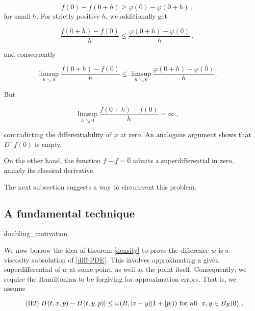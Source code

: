 		\begin{equation*}
			f(0) - f(0 + h) \geq \varphi(0) - \varphi(0 + h)  \ ,
		\end{equation*}
		for small $ h $. For strictly positive $ h $, we additionally get
		
		\begin{equation*}
			\frac{f( 0 + h) - f(0)}{h} \leq \frac{\varphi(0 + h) - \varphi(0)}{h} \ ,
		\end{equation*}
		
		and consequently 
		
		\begin{equation*}
			\limsup\limits_{h \searrow 0} \frac{f( 0 + h) - f(0)}{h} \leq \limsup\limits_{h \searrow 0} \frac{\varphi(0 + h) - \varphi(0)}{h} \ .
		\end{equation*}
		
		But 
		
		\begin{equation*}
			\limsup\limits_{h \searrow 0} \frac{f( 0 + h) - f(0)}{h} = \infty \ ,
		\end{equation*}
		
		contradicting the differentiability of $ \varphi $ at zero. An analogous argument shows that $ D^{-}f(0) $ is empty.
		
		On the other hand, the function $ f - f = \hat{0} $ admits a superdifferential in zero, namely its classical derivative.
		
		The next subsection suggests a way to circumvent this problem.
		
	\subsection{A fundamental technique}
	
		 {doubling_motivation}
		 
		 We now borrow the idea of theorem \ref{density} to prove the difference $ w $ is a viscosity subsolution of \eqref{diff-PDE}. This involves approximating a given superdifferential of $ w $ at some point, as well as the point itself. Consequently; we require the Hamiltonian to be forgiving for approximation errors. That is, we assume
		 
		 \begin{equation}
		 \tag{H2}
		 \lvert H(t, x, p) - H(t, y, p) \rvert \leq \omega(R, \lvert x - y \rvert (1 + \lvert p \rvert)) \hbox{ for all } \ x, y \in B_R(0) \ ,
		 \label{eqn:H2}
		 \end{equation}
		 
